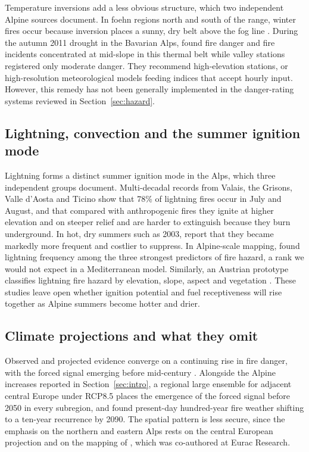 \documentclass[11pt,a4paper]{article}
\begin{document}
Temperature inversions add a less obvious structure, which two independent Alpine sources document. In foehn regions north and south of the range, winter fires occur because inversion places a sunny, dry belt above the fog line \citep{muller_forest_2020}. During the autumn 2011 drought in the Bavarian Alps, \citet{schunk_forest_2013} found fire danger and fire incidents concentrated at mid-slope in this thermal belt while valley stations registered only moderate danger. They recommend high-elevation stations, or high-resolution meteorological models feeding indices that accept hourly input. However, this remedy has not been generally implemented in the danger-rating systems reviewed in Section~\ref{sec:hazard}.

\subsection{Lightning, convection and the summer ignition mode}

Lightning forms a distinct summer ignition mode in the Alps, which three independent groups document. Multi-decadal records from Valais, the Grisons, Valle d'Aosta and Ticino show that 78\% of lightning fires occur in July and August, and that compared with anthropogenic fires they ignite at higher elevation and on steeper relief and are harder to extinguish because they burn underground. In hot, dry summers such as 2003, \citet{conedera_lightninginduced_2006} report that they became markedly more frequent and costlier to suppress. In Alpine-scale mapping, \citet{gerberding_mapping_2025} found lightning frequency among the three strongest predictors of fire hazard, a rank we would not expect in a Mediterranean model. Similarly, an Austrian prototype classifies lightning fire hazard by elevation, slope, aspect and vegetation \citep{muller_towards_2020}. These studies leave open whether ignition potential and fuel receptiveness will rise together as Alpine summers become hotter and drier.

\subsection{Climate projections and what they omit}

Observed and projected evidence converge on a continuing rise in fire danger, with the forced signal emerging before mid-century \citep{wastl_recent_2012, venalainen_temporal_2014, gerberding_mapping_2025, miller_climate_2024}. Alongside the Alpine increases reported in Section~\ref{sec:intro}, a regional large ensemble for adjacent central Europe under RCP8.5 places the emergence of the forced signal before 2050 in every subregion, and \citet{miller_climate_2024} found present-day hundred-year fire weather shifting to a ten-year recurrence by 2090. The spatial pattern is less secure, since the emphasis on the northern and eastern Alps rests on the central European projection and on the mapping of \citet{gerberding_mapping_2025}, which was co-authored at Eurac Research.
\end{document}
